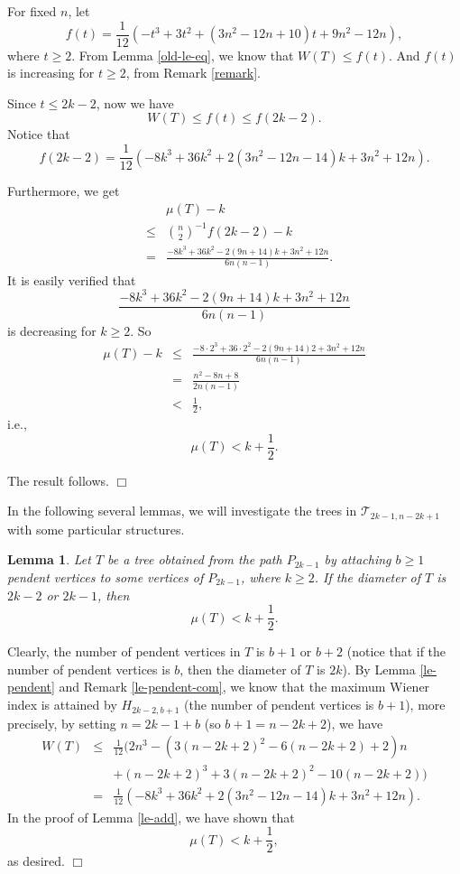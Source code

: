 \documentclass[12pt]{article}
\newtheorem{Lemma}{Lemma}[section]
\newenvironment {Proof} {\noindent {\bf Proof.}}{\hspace*{\fill}$\Box$\par\vspace{4mm}}
\begin{document}
\begin{Proof}
For fixed $n$, let
$$
f(t) = \frac{1}{12}( -t^3 + 3t^2 + (3n^2 - 12n + 10)t + 9n^2 - 12n),
$$
where $t \ge 2$.
From Lemma \ref{old-le-eq}, we know that
$W(T) \le f(t)$.
And $f(t)$ is increasing for $t \ge 2$, from Remark \ref{remark}.


Since $t \le 2 k - 2$, now we have
$$
W(T) \le f(t) \le f(2 k - 2).
$$
Notice that
$$
f(2k -2) = \frac{1}{12} (-8k ^3 + 36 k^2 + 2( 3n^2 -12 n - 14 ) k  + 3 n^2 + 12n  ).
$$

Furthermore, we get
\begin{eqnarray*}
&&\mu(T) - k \nonumber \\
&\le& \binom{n}{2}^{-1} f(2 k - 2) - k \nonumber \\
&=&  \frac{-8k ^3 + 36 k^2 - 2( 9 n + 14 ) k  + 3 n^2 + 12n }{6 n (n-1)}.
\end{eqnarray*}
It is easily verified that
$$
\frac{-8k ^3 + 36 k^2 - 2( 9 n + 14 ) k  + 3 n^2 + 12n }{6 n (n-1)}
$$
is decreasing for $k \ge 2$. So
\begin{eqnarray*}
\mu(T) - k &\le& \frac{-8\cdot 2 ^3 + 36 \cdot 2^2 - 2( 9 n + 14 ) 2  + 3 n^2 + 12n }{6 n (n-1)} \\
&=& \frac{  n^2 - 8 n + 8}{2 n (n-1)} \\
&<& \frac{1}{2},
\end{eqnarray*}
i.e.,
$$
\mu (T) < k + \frac{1}{2}.
$$



The result follows.
\end{Proof}

In the following several lemmas, we will investigate the trees in $\mathcal{T}_{2k-1,n-2k+1}$ with some particular structures.

\begin{Lemma} \label{diameter}
Let $T$ be a tree obtained from the path $P_{2k-1}$ by attaching $b \ge 1$ pendent vertices to some vertices of $P_{2k-1}$, where $k \ge 2$. If the diameter of $T$ is $2k-2$ or $2k-1$, then
$$
\mu (T) < k + \frac{1}{2}.
$$
\end{Lemma}

\begin{Proof}
Clearly, the number of pendent vertices in $T$ is $b+1$ or $b+2$ (notice that if the number of pendent vertices is $b$, then the diameter of $T$ is $2k$). By Lemma \ref{le-pendent} and Remark \ref{le-pendent-com}, we know that the maximum Wiener index is attained by $H_{2k-2,b+1}$ (the number of pendent vertices is $b+1$), more precisely, by setting $n = 2k -1+b$ (so $b + 1 = n - 2k + 2$), we have
\begin{eqnarray*}
W(T) &\le& \frac{1}{12} (2n^3 - (3(n - 2k + 2)^2-6(n - 2k + 2)+2)n  \\
&&+(n - 2k + 2)^3+3(n - 2k + 2)^2-10(n - 2k + 2))  \\
&=& \frac{1}{12} (-8k ^3 + 36 k^2 + 2( 3n^2 -12 n - 14 ) k  + 3 n^2 + 12n  ).
\end{eqnarray*}
In the proof of Lemma \ref{le-add}, we have shown that
$$
\mu (T) < k + \frac{1}{2},
$$
as desired.
\end{Proof}
\end{document}
